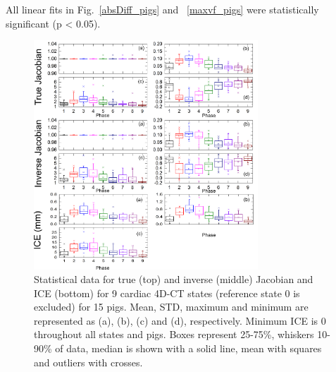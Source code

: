 \documentclass[type=dr, dr=rernat, accentcolor=tud7b,colorbacktitle, bigchapter, openright, twoside, 12pt ]{tudthesis}
\begin{document}
All linear fits in Fig.~\ref{absDiff_pigs} and ~\ref{maxvf_pigs} were statistically significant (p < 0.05).



\newpage

\begin{figure}[H]
	\begin{center}		
		\includegraphics[width=0.75\textwidth]{./Images/Jacobian_data_pigs.png}
		\caption{Statistical data for true (top) and inverse (middle) Jacobian and ICE (bottom) for 9 cardiac 4D-CT states (reference state 0 is excluded) for 15 pigs. Mean, STD, maximum and minimum are represented as (a), (b), (c) and (d), respectively.
		Minimum ICE is 0 throughout all states and pigs. Boxes represent 25-75\%, whiskers 10-90\% of data, median is shown with a solid line, mean with squares and outliers with crosses.}
		\label{jacobian_data_pigs}
	\end{center}
\end{figure}

\newpage

\end{document}
